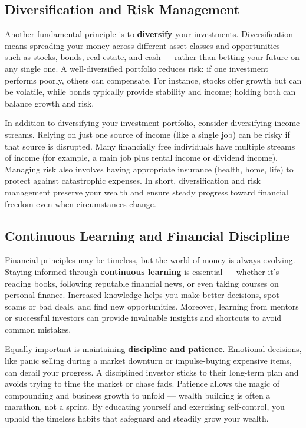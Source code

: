 \documentclass[12pt]{article}
\begin{document}
\subsection{Diversification and Risk Management}
Another fundamental principle is to \textbf{diversify} your investments. Diversification means spreading your money across different asset classes and opportunities --- such as stocks, bonds, real estate, and cash --- rather than betting your future on any single one. A well-diversified portfolio reduces risk: if one investment performs poorly, others can compensate. For instance, stocks offer growth but can be volatile, while bonds typically provide stability and income; holding both can balance growth and risk.
\par
In addition to diversifying your investment portfolio, consider diversifying income streams. Relying on just one source of income (like a single job) can be risky if that source is disrupted. Many financially free individuals have multiple streams of income (for example, a main job plus rental income or dividend income). Managing risk also involves having appropriate insurance (health, home, life) to protect against catastrophic expenses. In short, diversification and risk management preserve your wealth and ensure steady progress toward financial freedom even when circumstances change.
\subsection{Continuous Learning and Financial Discipline}
Financial principles may be timeless, but the world of money is always evolving. Staying informed through \textbf{continuous learning} is essential --- whether it's reading books, following reputable financial news, or even taking courses on personal finance. Increased knowledge helps you make better decisions, spot scams or bad deals, and find new opportunities. Moreover, learning from mentors or successful investors can provide invaluable insights and shortcuts to avoid common mistakes.
\par
Equally important is maintaining \textbf{discipline and patience}. Emotional decisions, like panic selling during a market downturn or impulse-buying expensive items, can derail your progress. A disciplined investor sticks to their long-term plan and avoids trying to time the market or chase fads. Patience allows the magic of compounding and business growth to unfold --- wealth building is often a marathon, not a sprint. By educating yourself and exercising self-control, you uphold the timeless habits that safeguard and steadily grow your wealth.
\end{document}
